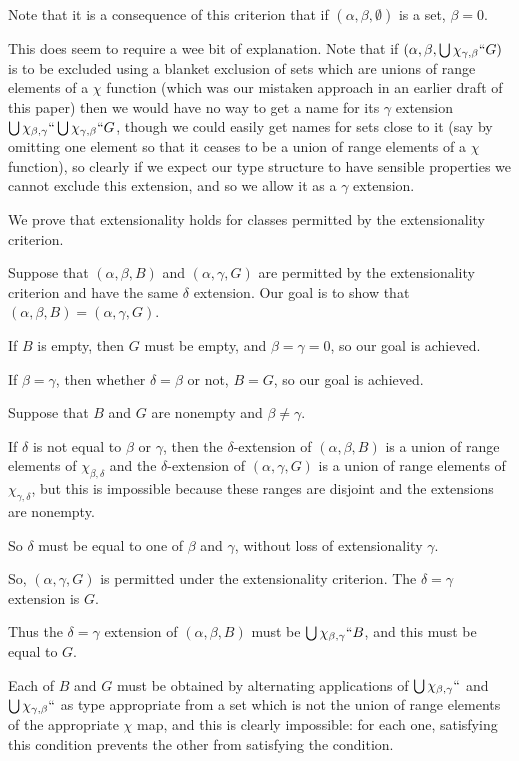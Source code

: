 \documentclass[12pt]{article}
\begin{document}
Note that it is a consequence of this criterion that if $(\alpha,\beta,\emptyset)$ is a set, $\beta=0$.

This does seem to require a wee bit of explanation.  Note that if $(\alpha,\beta,\bigcup \chi_{\gamma,\beta}``G)$ is to be excluded using a blanket exclusion of sets which are unions of range elements of a $\chi$ function (which was our mistaken approach in an earlier draft of this paper) then we would have no way to get a name for its $\gamma$ extension  $\bigcup \chi_{\beta,\gamma} ``\bigcup \chi_{\gamma,\beta}``G$, though we could easily get names for sets close to it (say by omitting one element so that it ceases to be a union of range elements of a $\chi$ function), so clearly if we expect our type structure to have sensible properties we cannot exclude this extension, and so we allow it as a $\gamma$ extension.

We prove that extensionality holds for classes permitted by the extensionality criterion.

Suppose that $(\alpha,\beta,B)$ and $(\alpha,\gamma,G)$ are permitted by the extensionality criterion and have the same $\delta$ extension.  Our goal is to show that $(\alpha,\beta,B)=(\alpha,\gamma,G)$.

If $B$ is empty, then $G$ must be empty, and $\beta=\gamma=0$, so our goal is achieved.

If $\beta=\gamma$, then whether $\delta=\beta$ or not, $B=G$, so our goal is achieved.

Suppose that $B$ and $G$ are nonempty and $\beta \neq \gamma$.

If $\delta$ is not equal to $\beta$ or $\gamma$, then the $\delta$-extension of $(\alpha,\beta,B)$ is a union 
of range elements of $\chi_{\beta,\delta}$ and the $\delta$-extension of $(\alpha,\gamma,G)$ is a union 
of range elements of $\chi_{\gamma,\delta}$, but this is impossible because these ranges are disjoint and the extensions are nonempty.

So $\delta$ must be equal to one of $\beta$ and $\gamma$, without loss of extensionality $\gamma$.

So, $(\alpha,\gamma,G)$ is permitted under the extensionality criterion.  The $\delta=\gamma$ extension is $G$.

Thus the $\delta=\gamma$ extension of $(\alpha,\beta,B)$ must be $\bigcup \chi_{\beta,\gamma}``B$, and this must be equal to $G$.

Each of $B$ and $G$ must be obtained by alternating applications of  $\bigcup \chi_{\beta,\gamma}``$ and $\bigcup \chi_{\gamma,\beta}``$ as type appropriate from a set which is
not the union of range elements of the appropriate $\chi$ map, and this is clearly impossible:  for each one, satisfying this condition prevents the other from satisfying the condition.
\end{document}
